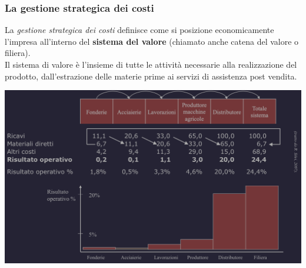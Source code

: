 \documentclass{article}
\begin{document}
\subsubsection{La gestione strategica dei costi}
La \textit{gestione strategica dei costi} definisce come si posizione economicamente l'impresa all'interno del \textbf{sistema del valore} (chiamato anche catena del valore o filiera).\\
Il sistema di valore è l'insieme di tutte le attività necessarie alla realizzazione del prodotto, dall'estrazione delle materie prime ai servizi di assistenza post vendita.
\begin{center}
    \includegraphics[scale=0.3]{Image/GestStrategica_1.png}
\end{center}
\end{document}
